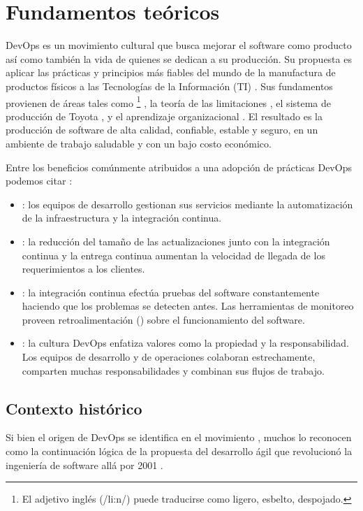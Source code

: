 \chapter{Fundamentos teóricos}

DevOps es un movimiento cultural que busca mejorar el software como
producto así como también la vida de quienes se dedican a su
producción. Su propuesta es aplicar las prácticas y principios más
fiables del mundo de la manufactura de productos físicos a las
Tecnologías de la Información (TI)
\cite{handbook}. Sus
fundamentos provienen de áreas tales como \footnote{ El
  adjetivo inglés  (/li:n/) puede traducirse como ligero,
  esbelto, despojado.} \cite{lean}, la teoría de
las limitaciones
\cite{thegoal}, el sistema de
producción de Toyota
\cite{toyota}, y el
aprendizaje organizacional
\cite{fifth}. El resultado
es la producción de software de alta calidad, confiable, estable y
seguro, en un ambiente de trabajo saludable y con un bajo costo
económico.

Entre los beneficios comúnmente atribuidos a una adopción de prácticas
DevOps podemos citar
\cite{awsdevops}:

\begin{itemize}
\item {}: los equipos de desarrollo gestionan sus
  servicios mediante la automatización de la infraestructura y la
  integración continua.
\item {}: la reducción del tamaño de las
  actualizaciones junto con la integración continua y la entrega
  continua aumentan la velocidad de llegada de los requerimientos a
  los clientes.
\item {}: la integración continua efectúa pruebas
  del software constantemente haciendo que los problemas se detecten
  antes. Las herramientas de monitoreo proveen retroalimentación
  () sobre el funcionamiento del software.
\item {}: la cultura DevOps enfatiza valores como
  la propiedad y la responsabilidad. Los equipos de desarrollo y de
  operaciones colaboran estrechamente, comparten muchas
  responsabilidades y combinan sus flujos de trabajo.
\end{itemize}
\section{Contexto histórico}

Si bien el origen de DevOps se identifica en el movimiento
, muchos lo reconocen como la continuación lógica de la
propuesta del desarrollo ágil que revolucionó la ingeniería de
software allá por 2001
\cite{agilemanifesto}.

